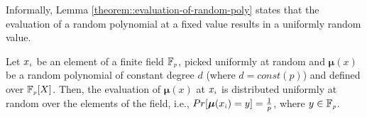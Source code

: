 Informally, Lemma \ref{theorem::evaluation-of-random-poly} states that the evaluation of a random polynomial at a fixed value results in a uniformly random value. %




\begin{lemma}\label{theorem::evaluation-of-random-poly}
Let $x_{\scriptscriptstyle i}$ be an element of a finite field $\mathbb{F}_{\scriptscriptstyle p}$, picked uniformly at random and $\bm\mu(x)$ be a random polynomial of constant degree $d$ (where $d=const(p)$) and defined over $\mathbb{F}_{\scriptscriptstyle p}[X]$. 
%
 Then, the evaluation of $\bm\mu(x)$ at $x_{\scriptscriptstyle i}$ is distributed uniformly at random over the elements of the  field, i.e., $Pr[\bm\mu(x_{\scriptscriptstyle i})=y]=\frac{1}{p}$, where $y\in \mathbb{F}_{\scriptscriptstyle p}$. 


\end{lemma}



